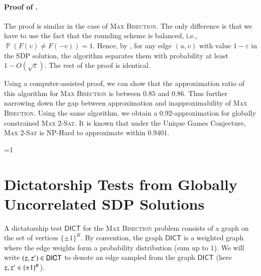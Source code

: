 \documentclass[11pt]{article}
\def\full{1}
\newtheorem{theorem}{Theorem}[section]
\theoremstyle{definition}
\newcommand{\Psymb}{\mathbb{P}}
\DeclareMathOperator*{\ProbOp}{\Psymb}
\renewcommand{\Pr}{\ProbOp}
\newcommand{\sbits}{\{\pm1\}}
\newcommand{\ie}{i.e.,\xspace}
\newcommand{\problemmacro}[1]{\texorpdfstring{\textsc{#1}}{#1}\xspace}
\newcommand{\maxtwosat}{\problemmacro{Max $2$-Sat}}
\newcommand{\maxbisection}{\problemmacro{Max Bisection}}
\let\epsilon=\varepsilon
\numberwithin{equation}{section}
\newcommand{\eps}{\epsilon}
\let\origparagraph\paragraph
\renewcommand{\paragraph}[1]{\origparagraph{#1.}}
\newcommand{\dict} {\textsf{DICT}}
\newcommand{\mrv}[1]{\bm{\lowercase{#1}}}
\let\pref=\prettyref
\begin{document}
\paragraph{Proof of \pref{thm:max-bisection}}
The proof is similar in the case of \maxbisection. The only difference is that we have to use the fact that the rounding scheme is balanced, \ie  $\Pr(F(v)\neq F(-v))=1$. Hence, by \pref{lem:rooteps}, for any edge $(u,v)$ with value $1-\epsilon$ in the SDP solution, the algorithm separates them with probability at least $1-O(\sqrt{\eps})$. The rest of the proof is identical.




\iffalse
\begin{theorem}
Given a graph $G=(V,E)$ admits a bisection (with respect to weight vector $W$) with value $1-\eps$ and $\delta>0$, there exists a randomized algorithm that finds a cut $(S,\bar{S}$ satisfying:
\begin{enumerate}
\item
$$
|\sum_{i\in S}w_i-1/2|<\delta
$$
\item
The size of the cut is at least $1-O(\sqrt{\eps})$
\end{enumerate}
The algorithm is based on rounding a $O(\text{poly}(1/\delta)$ Lasserre's SDP hierarchy.
\end{theorem}
\fi

Using a computer-assisted proof, we can show that the approximation
ratio of this algorithm for \maxbisection is between $0.85$ and $0.86$.
Thus further narrowing down the gap between approximation and inapproximability of \maxbisection.
Using the same algorithm, we obtain a $0.92$-approximation for globally constrained \maxtwosat. It is known that under the Unique Games Conjecture, \maxtwosat is NP-Hard to approximate within $0.9401$.


\ifnum\full=1

\section{Dictatorship Tests from Globally Uncorrelated SDP Solutions}

\label{sec:gaptodict}

A dictatorship test $\dict$ for the \maxbisection problem
	consists of a graph on the set of vertices
	$\sbits^{R}$.  By convention, the graph $\dict$
	is a weighted graph where the edge weights form a
	probability distribution (sum up to $1$).  We will
	write $(\mrv{z},\mrv{z}') \in \dict$ to denote an edge
	sampled from the graph $\dict$ (here $\mrv{z},\mrv{z}'
	\in \sbits^{R}$).
\end{document}
